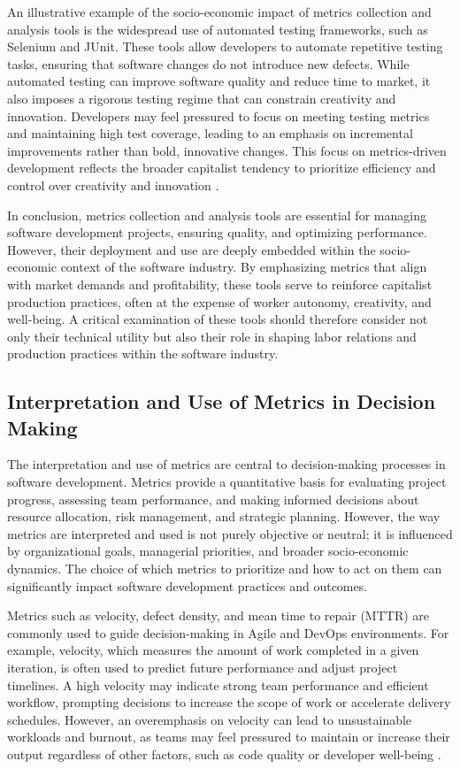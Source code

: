 \begin{refsection}
An illustrative example of the socio-economic impact of metrics collection and analysis tools is the widespread use of automated testing frameworks, such as Selenium and JUnit. These tools allow developers to automate repetitive testing tasks, ensuring that software changes do not introduce new defects. While automated testing can improve software quality and reduce time to market, it also imposes a rigorous testing regime that can constrain creativity and innovation. Developers may feel pressured to focus on meeting testing metrics and maintaining high test coverage, leading to an emphasis on incremental improvements rather than bold, innovative changes. This focus on metrics-driven development reflects the broader capitalist tendency to prioritize efficiency and control over creativity and innovation \cite[pp.~54-57]{Feathers2004WorkingEffectively}.

In conclusion, metrics collection and analysis tools are essential for managing software development projects, ensuring quality, and optimizing performance. However, their deployment and use are deeply embedded within the socio-economic context of the software industry. By emphasizing metrics that align with market demands and profitability, these tools serve to reinforce capitalist production practices, often at the expense of worker autonomy, creativity, and well-being. A critical examination of these tools should therefore consider not only their technical utility but also their role in shaping labor relations and production practices within the software industry.

\subsection{Interpretation and Use of Metrics in Decision Making}

The interpretation and use of metrics are central to decision-making processes in software development. Metrics provide a quantitative basis for evaluating project progress, assessing team performance, and making informed decisions about resource allocation, risk management, and strategic planning. However, the way metrics are interpreted and used is not purely objective or neutral; it is influenced by organizational goals, managerial priorities, and broader socio-economic dynamics. The choice of which metrics to prioritize and how to act on them can significantly impact software development practices and outcomes.

Metrics such as velocity, defect density, and mean time to repair (MTTR) are commonly used to guide decision-making in Agile and DevOps environments. For example, velocity, which measures the amount of work completed in a given iteration, is often used to predict future performance and adjust project timelines. A high velocity may indicate strong team performance and efficient workflow, prompting decisions to increase the scope of work or accelerate delivery schedules. However, an overemphasis on velocity can lead to unsustainable workloads and burnout, as teams may feel pressured to maintain or increase their output regardless of other factors, such as code quality or developer well-being \cite[pp.~89-91]{Schwaber2018AgileSoftwareDevelopment}.


\end{refsection}
